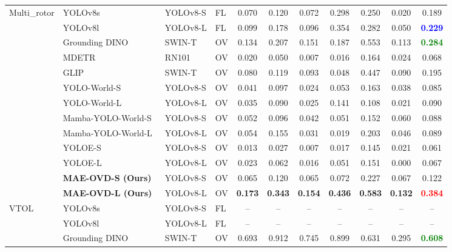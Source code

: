 \documentclass[letterpaper, 10 pt, conference]{ieeeconf}  %
\begin{document}
\begin{table}[!p]
\begin{tabular}{l|lll|cccccc|c}
\hline\hline
\multirow{13}{*}{Multi\_rotor} & YOLOv8s & YOLOv8-S & FL & 0.070 & 0.120 & 0.072 & 0.298 & 0.250 & 0.020 & 0.189 \\
 & YOLOv8l & YOLOv8-L & FL & 0.099 & 0.178 & 0.096 & 0.354 & 0.282 & 0.050 & \textbf{\textcolor{blue}{0.229}} \\
\cline{2-11}
 & Grounding DINO~\cite{liu2024groundingdino} & SWIN-T & OV & 0.134 & 0.207 & 0.151 & 0.187 & 0.553 & 0.113 & \textbf{\textcolor{green}{0.284}} \\
 & MDETR~\cite{kamath2021mdetr} & RN101 & OV & 0.020 & 0.050 & 0.007 & 0.016 & 0.164 & 0.024 & 0.068 \\
 & GLIP~\cite{li2022glip} & SWIN-T & OV & 0.080 & 0.119 & 0.093 & 0.048 & 0.447 & 0.090 & 0.195 \\
 & YOLO-World-S~\cite{cheng2024yoloworld} & YOLOv8-S & OV & 0.041 & 0.097 & 0.024 & 0.053 & 0.163 & 0.038 & 0.085 \\
 & YOLO-World-L~\cite{cheng2024yoloworld} & YOLOv8-L & OV & 0.035 & 0.090 & 0.025 & 0.141 & 0.108 & 0.021 & 0.090 \\
 & Mamba-YOLO-World-S~\cite{wang2025mambayoloworld} & YOLOv8-S & OV & 0.052 & 0.096 & 0.042 & 0.051 & 0.152 & 0.060 & 0.088 \\
 & Mamba-YOLO-World-L~\cite{wang2025mambayoloworld} & YOLOv8-L & OV & 0.054 & 0.155 & 0.031 & 0.019 & 0.203 & 0.046 & 0.089 \\
 & YOLOE-S~\cite{wang2025yoloe} & YOLOv8-S & OV & 0.013 & 0.027 & 0.007 & 0.017 & 0.145 & 0.021 & 0.061 \\
 & YOLOE-L~\cite{wang2025yoloe} & YOLOv8-L & OV & 0.023 & 0.062 & 0.016 & 0.051 & 0.151 & 0.000 & 0.067 \\
\hhline{~----------}
\rowcolor{gray!15}\cellcolor{white} & \textbf{MAE-OVD-S (Ours)} & YOLOv8-S & OV & 0.065 & 0.120 & 0.065 & 0.072 & 0.227 & 0.067 & 0.122 \\
\rowcolor{gray!15}\cellcolor{white} & \textbf{MAE-OVD-L (Ours)} & YOLOv8-L & OV & \textbf{0.173} & \textbf{0.343} & \textbf{0.154} & \textbf{0.436} & \textbf{0.583} & \textbf{0.132} & \textbf{\textcolor{red}{0.384}} \\
\hline\hline
\multirow{13}{*}{VTOL} & YOLOv8s & YOLOv8-S & FL & -- & -- & -- & -- & -- & -- & -- \\
 & YOLOv8l & YOLOv8-L & FL & -- & -- & -- & -- & -- & -- & -- \\
\cline{2-11}
 & Grounding DINO~\cite{liu2024groundingdino} & SWIN-T & OV & 0.693 & 0.912 & 0.745 & 0.899 & 0.631 & 0.295 & \textbf{\textcolor{green}{0.608}} \\

\end{tabular}
\end{table}
\end{document}
